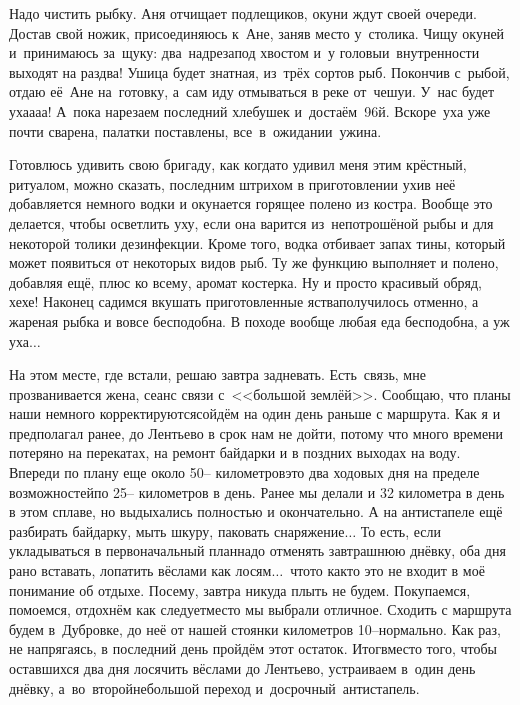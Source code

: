 Надо чистить рыбку. Аня отчищает подлещиков, окуни ждут своей очереди. Достав свой ножик, присоединяюсь к~Ане, заняв место у~столика. Чищу окуней и~принимаюсь за~щуку: два~надреза\mdash под хвостом и~у головы\mdash и~внутренности выходят на раз\sdash два! Ушица будет знатная, из~трёх сортов рыб. Покончив с~рыбой, отдаю её~Ане на~готовку, а~сам иду отмываться в реке от~чешуи. У~нас будет уха\sdash а\sdash а\sdash а! А~пока нарезаем последний хлебушек и~достаём~96\sdash й. Вскоре~уха уже почти сварена, палатки поставлены, все~в~ожидании~ужина. 

Готовлюсь удивить свою бригаду, как когда\sdash то удивил меня этим крёстный, ритуалом, можно сказать, последним штрихом в приготовлении ухи\mdash в неё добавляется немного водки и окунается горящее полено из костра. Вообще это делается, чтобы осветлить уху, если она варится из~непотрошёной рыбы и для некоторой толики дезинфекции. Кроме того, водка отбивает запах тины, который может появиться от некоторых видов рыб. Ту же функцию выполняет и полено, добавляя ещё, плюс ко всему, аромат костерка. Ну и просто красивый обряд, хе\sdash хе! Наконец садимся вкушать приготовленные яства\mdash получилось отменно, а жареная рыбка и вовсе бесподобна. В походе вообще любая еда бесподобна, а уж уха$\ldots$

На этом месте, где встали, решаю завтра задневать. Есть~связь, мне прозванивается жена, сеанс связи с~<<большой землёй>>. Сообщаю, что планы наши немного корректируются\mdash сойдём на один день раньше с маршрута. Как я и предполагал ранее, до Лентьево в срок нам не дойти, потому что много времени потеряно на перекатах, на ремонт байдарки и в поздних выходах на воду. Впереди по плану еще около 50\thinspace-- километров\mdash это два ходовых дня на пределе возможностей\mdash по 25\thinspace-- километров в день. Ранее мы делали и 32 километра в день в этом сплаве, но выдыхались полностью и окончательно. А на антистапеле ещё разбирать байдарку, мыть шкуру, паковать снаряжение$\ldots$
\newpage
То есть, если укладываться в первоначальный план\mdash надо отменять завтрашнюю днёвку, оба дня рано вставать, лопатить вёслами как лосям$\ldots$~что\sdash то как\sdash то это не входит в моё понимание об отдыхе. Посему, завтра никуда плыть не будем. Покупаемся, помоемся, отдохнём как следует\mdash место мы выбрали отличное. Сходить с маршрута будем в~Дубровке, до неё от нашей стоянки километров 10\thinspace\nobreakdash--\mdash нормально. Как раз, не напрягаясь, в последний день пройдём этот остаток. Итог\mdash вместо того, чтобы оставшихся два дня лосячить вёслами до Лентьево, устраиваем в~один день днёвку, а~во~второй\mdash небольшой переход и~досрочный~антистапель. 

